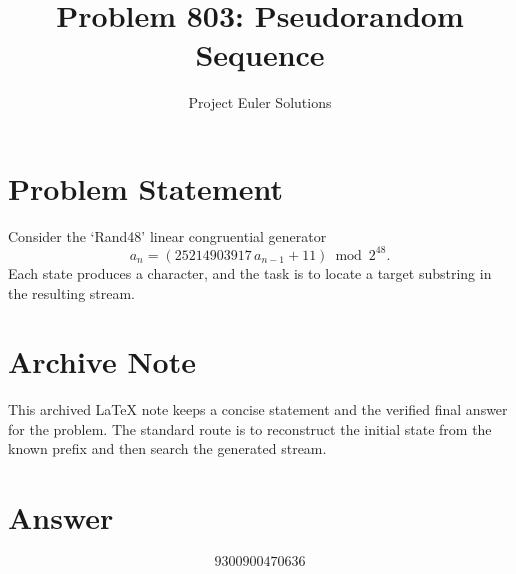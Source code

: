\documentclass[11pt]{article}
\title{Problem 803: Pseudorandom Sequence}
\author{Project Euler Solutions}
\date{}
\begin{document}
\maketitle

\section{Problem Statement}
Consider the `Rand48' linear congruential generator
\[
a_n = (25214903917\,a_{n-1} + 11) \bmod 2^{48}.
\]
Each state produces a character, and the task is to locate a target substring in the resulting stream.

\section{Archive Note}
This archived LaTeX note keeps a concise statement and the verified final answer for the problem. The standard route is to reconstruct the initial state from the known prefix and then search the generated stream.

\section{Answer}

\[
\boxed{9300900470636}
\]
\end{document}
